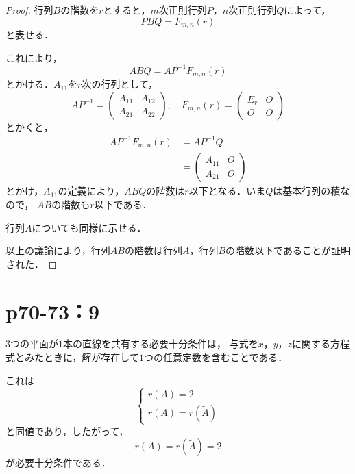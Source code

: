 \documentclass[a4paper,10pt,fleqn]{ltjsarticle}
\begin{document}
\begin{leftbar}
    \begin{proof}
        行列$B$の階数を$r$とすると，$m$次正則行列$P$，$n$次正則行列$Q$によって，
        \[
            P B Q = F_{m,n} (r)
        \]
        と表せる．

        これにより，
        \[
            ABQ = A P^{-1} F_{m,n} (r)
        \]
        とかける．$A_{11}$を$r$次の行列として，
        \[
            A P^{-1} = \begin{pmatrix} A_{11} & A_{12} \\ A_{21} & A_{22} \end{pmatrix}, \quad F_{m,n} (r) = \begin{pmatrix} E_r & O \\ O & O \end{pmatrix}
        \]
        とかくと，
        \begin{align*}
            A P^{-1} F_{m,n} (r) & = A P^{-1} Q                                            \\
                                 & = \begin{pmatrix} A_{11}& O \\ A_{21} & O \end{pmatrix}
        \end{align*}
        とかけ，$A_{11}$の定義により，$ABQ$の階数は$r$以下となる．いま$Q$は基本行列の積なので， $AB$の階数も$r$以下である．

        行列$A$についても同様に示せる．

        以上の議論により，行列$AB$の階数は行列$A$，行列$B$の階数以下であることが証明された．

    \end{proof}
\end{leftbar}

\newpage


\section*{p70-73：9}

\begin{tleftbar}
    $3$つの平面が$1$本の直線を共有する必要十分条件は，
    与式を$x$，$y$，$z$に関する方程式とみたときに，解が存在して$1$つの任意定数を含むことである．

    これは
    \[
        \begin{cases}
            r(A)=2 \\
            r(A)=r(\tilde{A})
        \end{cases}
    \]
    と同値であり，したがって，
    \[
        r(A)=r(\tilde{A})=2
    \]
    が必要十分条件である．
\end{tleftbar}
\end{document}
